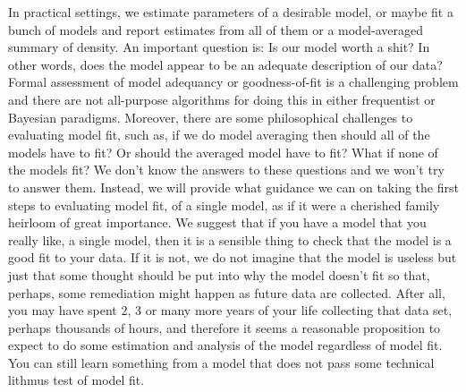 In practical settings, we estimate parameters of a desirable model, or
maybe fit a bunch of models and report estimates from all of them or a
model-averaged summary of density.  An important question is: Is our
model worth a shit?  In other words, does the model appear to be an
adequate description of our data? 
Formal
assessment of model adequancy or goodness-of-fit is a challenging
problem and there are not all-purpose algorithms for doing this in
either frequentist or Bayesian paradigms. Moreover, there are some
philosophical challenges to evaluating model fit, such as, if we do
model averaging then should all of the models have to fit? Or should
the averaged model have to fit? What if none of the models fit?
We don't know the answers to these questions and we
won't try to answer them. Instead, we will provide what guidance we
can on taking the first steps to evaluating model fit, of a single
model, as if it were a cherished family heirloom of great
importance.  We suggest that if you have a model that you really like,
a single model, then it is a sensible thing to check that the model is
a good fit to your data. If it is not, we do not imagine that the
model is useless but just that some thought should be put into why the
model doesn't fit so that, perhaps, some remediation might happen as
future data are collected. After all, you may have spent 2, 3 or many
more years of your life collecting that data set, perhaps thousands of
hours, and therefore it seems a reasonable proposition to expect to do
some estimation and analysis of the model regardless of model fit. You
can still learn something from a model that does not pass some
technical lithmus test of model fit.  

